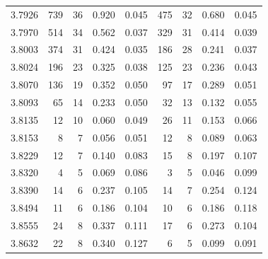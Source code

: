 \begin{table}
\begin{tabular}{c r@{$\;\pm\;$}r r@{$\;\pm\;$}l r@{$\;\pm\;$}r r@{$\;\pm\;$}l}
3.7926 &  739 & 36 & 0.920 & 0.045 &  475 & 32 & 0.680 & 0.045 \\
3.7970 &  514 & 34 & 0.562 & 0.037 &  329 & 31 & 0.414 & 0.039 \\
3.8003 &  374 & 31 & 0.424 & 0.035 &  186 & 28 & 0.241 & 0.037 \\
3.8024 &  196 & 23 & 0.325 & 0.038 &  125 & 23 & 0.236 & 0.043 \\
3.8070 &  136 & 19 & 0.352 & 0.050 &   97 & 17 & 0.289 & 0.051 \\
3.8093 &   65 & 14 & 0.233 & 0.050 &   32 & 13 & 0.132 & 0.055 \\
3.8135 &   12 & 10 & 0.060 & 0.049 &   26 & 11 & 0.153 & 0.066 \\
3.8153 &    8 &  7 & 0.056 & 0.051 &   12 &  8 & 0.089 & 0.063 \\
3.8229 &   12 &  7 & 0.140 & 0.083 &   15 &  8 & 0.197 & 0.107 \\
3.8320 &    4 &  5 & 0.069 & 0.086 &    3 &  5 & 0.046 & 0.099 \\
3.8390 &   14 &  6 & 0.237 & 0.105 &   14 &  7 & 0.254 & 0.124 \\
3.8494 &   11 &  6 & 0.186 & 0.104 &   10 &  6 & 0.186 & 0.118 \\
3.8555 &   24 &  8 & 0.337 & 0.111 &   17 &  6 & 0.273 & 0.104 \\
3.8632 &   22 &  8 & 0.340 & 0.127 &    6 &  5 & 0.099 & 0.091 \\

\end{tabular}
\end{table}
